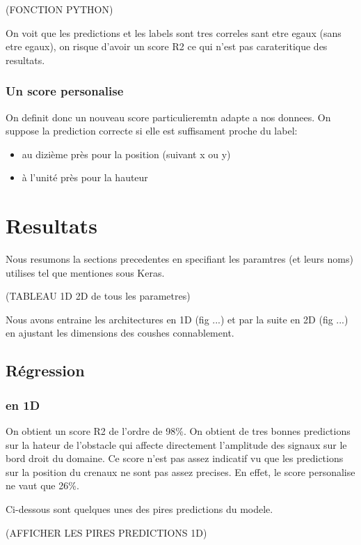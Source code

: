 (FONCTION PYTHON)

On voit que les predictions et les labels sont tres correles sant etre egaux (sans etre egaux), on risque d'avoir un score R2 ce qui n'est pas carateritique des resultats.

\subsubsection{Un score personalise}
On definit donc un nouveau score particulieremtn adapte a nos donnees. On suppose la prediction correcte si elle est suffisament proche du label:
\begin{itemize}
 \item au dizième près pour la position (suivant x ou y)
 \item à l'unité près pour la hauteur
\end{itemize}


\section{Resultats}

Nous resumons la sections precedentes en specifiant les paramtres (et leurs noms) utilises tel que mentiones sous Keras.

(TABLEAU 1D 2D de tous les parametres)

Nous avons entraine les architectures en 1D (fig ...) et par la suite en 2D (fig ...) en ajustant les dimensions des coushes connablement.

\subsection{Régression}
% 
    \subsubsection{en 1D}
    On obtient un score R2 de l'ordre de 98\%. On obtient de tres bonnes predictions sur la hateur de l'obstacle qui affecte directement l'amplitude des signaux sur le bord droit du domaine. Ce score n'est pas assez indicatif vu que les predictions sur la position du crenaux ne sont pas assez precises. En effet, le score personalise ne vaut que 26\%.
    
    Ci-dessous sont quelques unes des pires predictions du modele.
    
    (AFFICHER LES PIRES PREDICTIONS 1D)

